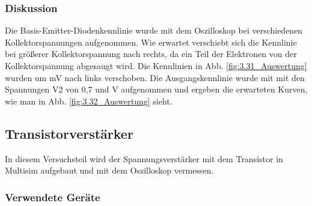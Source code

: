 \documentclass[12pt,a4paper]{article}
\begin{document}
\subsubsection{Diskussion}
Die Basis-Emitter-Diodenkennlinie wurde mit dem Oszilloskop bei verschiedenen Kollektorspannungen aufgenommen. Wie erwartet verschiebt sich die Kennlinie bei größerer Kollektorspannung nach rechts, da ein Teil der Elektronen von der Kollektorspannung abgesaugt wird. Die Kennlinien in Abb. \ref{fig:3.31_Auswertung} wurden um \unit[480]{mV} nach links verschoben. Die Ausgangskennlinie wurde mit mit den Spannungen V2 von 0,7 und \unit[0,8]{V} aufgenommen und ergeben die erwarteten Kurven, wie man in Abb. \ref{fig:3.32_Auswertung} sieht. 

\subsection{Transistorverstärker}
In diesem Versuchsteil wird der Spannungsverstärker mit dem Transistor in Multisim aufgebaut und mit dem Oszilloskop vermessen.
\subsubsection{Verwendete Geräte}
\end{document}
